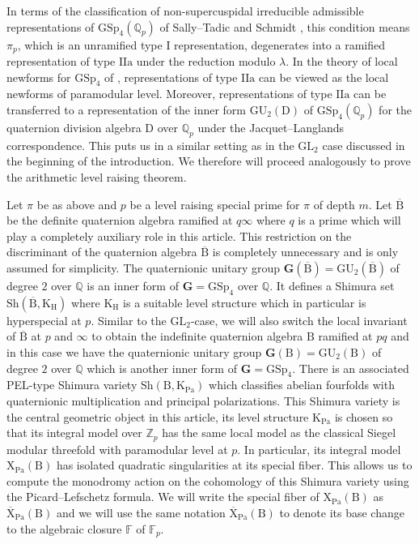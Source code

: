 \documentclass[10pt]{amsart}
\numberwithin{equation}{section}
\theoremstyle{definition}
\def\GL{\mathrm{GL}}
\def\GSp{\mathrm{GSp}}
\def\GU{\mathrm{GU}}
\def\Pa{\mathrm{Pa}}
\def\FF{\mathbb{F}}
\def\bfG{\mathbf{G}}
\def\QQ{\mathbb{Q}}
\def\ZZ{\mathbb{Z}}
\def\rma{\mathrm{a}}
\def\rmB{\mathrm{B}}
\def\rmD{\mathrm{D}}
\def\rmH{\mathrm{H}}
\def\rmI{\mathrm{I}}
\def\rmK{\mathrm{K}}
\def\rmX{\mathrm{X}}
\def\Sh{\mathrm{Sh}}
\begin{document}
In terms of the classification of non-supercuspidal irreducible admissible representations of $\GSp_{4}(\QQ_{p})$ of Sally--Tadic \cite{ST-classification} and Schmidt \cite{Sch-Iwahori},  this condition means $\pi_{p}$, which is an unramified type $\rmI$ representation, degenerates into a ramified representation of type $\rmI\rmI{\rma}$ under the reduction modulo $\lambda$. In the theory of local newforms for $\GSp_{4}$ of \cite{BS-newform}, representations of type $\rmI\rmI{\rma}$ can be viewed as the local newforms of paramodular level. Moreover, representations of type $\rmI\rmI{\rma}$ can be transferred to a representation of the inner form $\GU_{2}(\rmD)$ of $\GSp_{4}(\QQ_{p})$ for the quaternion division algebra $\rmD$ over $\QQ_{p}$ under the Jacquet--Langlands correspondence. This puts us in a similar setting as in the $\GL_{2}$ case discussed in the beginning of the introduction. We therefore will proceed analogously to prove the arithmetic level raising theorem.

Let $\pi$ be as above and $p$ be a level raising special prime for $\pi$ of depth $m$. Let $\overline{\rmB}$ be the definite quaternion algebra ramified at $q\infty$ where $q$ is a prime which will play a completely auxiliary role in this article. This restriction on the discriminant of the  quaternion algebra $\overline{\rmB}$ is completely unnecessary and is only assumed for simplicity. 
The quaternionic unitary group $\bfG(\overline{\rmB})=\GU_{2}(\overline{\rmB})$ of degree $2$ over $\QQ$ is an inner form of $\bfG=\GSp_{4}$ over $\QQ$. It defines a Shimura set $\Sh(\overline{\rmB}, \rmK_{\rmH})$ where $\rmK_{\rmH}$ is a suitable level structure which in particular is hyperspecial at $p$. Similar to the $\GL_{2}$-case, we will also switch the local invariant of $\overline{\rmB}$ at $p$ and $\infty$ to obtain the indefinite quaternion algebra $\rmB$ ramified at $pq$ and in this case we have the quaternionic unitary group $\bfG(\rmB)=\GU_{2}(\rmB)$ of degree $2$ over $\QQ$ which is another inner form of $\bfG=\GSp_{4}$. There is an associated PEL-type Shimura variety $\Sh(\rmB, \rmK_{\Pa})$ which classifies abelian fourfolds with quaternionic multiplication and principal polarizations. This Shimura variety is the central geometric object in this article, its level structure $\rmK_{\Pa}$ is chosen so that its integral model over $\ZZ_{p}$ has the same local model as the classical Siegel modular threefold with paramodular level at $p$. In particular, its integral model $\rmX_{\Pa}(\rmB)$ has isolated quadratic singularities at its special fiber. This allows us to compute the monodromy action on the cohomology of this Shimura variety using the Picard--Lefschetz formula. We will write the special fiber of $\rmX_{\Pa}(\rmB)$ as $\overline{\rmX}_{\Pa}(\rmB)$ and we will use the same notation $\overline{\rmX}_{\Pa}(\rmB)$ to denote its base change to the algebraic closure $\FF$ of $\FF_{p}$.
\end{document}
